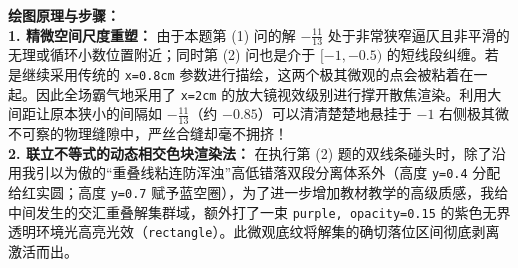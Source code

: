 \vspace{0.4cm}
{\small\color{blue!70!black}
\textbf{绘图原理与步骤：}\\
\textbf{1. 精微空间尺度重塑：} 由于本题第 (1) 问的解 $-\frac{11}{13}$ 处于非常狭窄逼仄且非平滑的无理或循环小数位置附近；同时第 (2) 问也是介于 $[-1, -0.5)$ 的短线段纠缠。若是继续采用传统的 \texttt{x=0.8cm} 参数进行描绘，这两个极其微观的点会被粘着在一起。因此全场霸气地采用了 \texttt{x=2cm} 的放大镜视效级别进行撑开散焦渲染。利用大间距让原本狭小的间隔如 $-\frac{11}{13}$（约 $-0.85$）可以清清楚楚地悬挂于 $-1$ 右侧极其微不可察的物理缝隙中，严丝合缝却毫不拥挤！\\
\textbf{2. 联立不等式的动态相交色块渲染法：} 在执行第 (2) 题的双线条碰头时，除了沿用我引以为傲的“重叠线粘连防浑浊”高低错落双段分离体系外（高度 \texttt{y=0.4} 分配给红实圆；高度 \texttt{y=0.7} 赋予蓝空圈），为了进一步增加教材教学的高级质感，我给中间发生的交汇重叠解集群域，额外打了一束 \texttt{purple, opacity=0.15} 的紫色无界透明环境光高亮光效（\texttt{rectangle}）。此微观底纹将解集的确切落位区间彻底剥离激活而出。
}

\newpage
